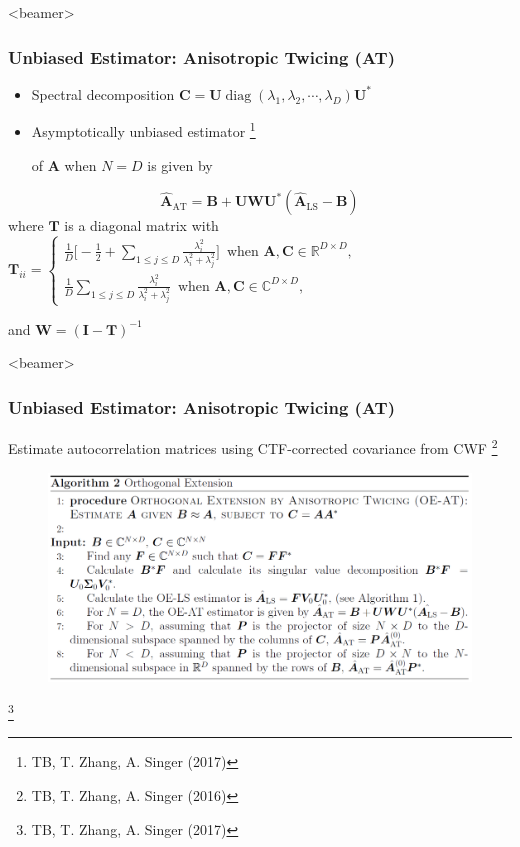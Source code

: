 \documentclass{beamer}
\newcommand\blfootnote[1]{%
  \begingroup
  \renewcommand\thefootnote{}\footnote{#1}%
  \addtocounter{footnote}{-1}%
  \endgroup
}
\newcommand{\bC}{\boldsymbol{C}}
\newcommand{\bT}{\boldsymbol{T}}
\newcommand{\bW}{\boldsymbol{W}}
\newcommand{\bU}{\boldsymbol{U}}
\newcommand{\bI}{\boldsymbol{I}}
\def\bA{\boldsymbol{A}}
\def\bB{\boldsymbol{B}}
\newcommand{\diag}{\operatorname{diag}}
\begin{document}
\begin{frame}<beamer>
\frametitle{Unbiased Estimator: Anisotropic Twicing (AT)}
\begin{itemize}
\item Spectral decomposition $\bC=\bU\diag(\lambda_1,\lambda_2,\cdots,\lambda_D)\bU^*$
\item Asymptotically unbiased estimator \blfootnote{TB, T. Zhang, A. Singer (2017)} of $\bA$ when $N=D$ is given by
\end{itemize}

\begin{equation*}
\hat{\bA}_{\text{AT}}=\bB+\bU\bW\bU^*(\hat{\bA}_{\text{LS}}-\bB) \nonumber
\end{equation*}
where 
$\bT$ is a diagonal matrix with
$\bT_{ii}=\begin{cases}\frac{1}{D}\Big[-\frac{1}{2}+\sum_{1\leq j\leq 
D}\frac{\lambda_i^2}{\lambda_i^2+\lambda_j^2}\Big]\,\,\,\text{when 
$\bA,\bC\in\mathbb{R}^{D\times D}$},\\\frac{1}{D}\sum_{1\leq j\leq 
D}\frac{\lambda_i^2}{\lambda_i^2+\lambda_j^2}
\,\,\,\text{when $\bA,\bC\in\mathbb{C}^{D\times D}$},
\end{cases}$

and $\bW=(\bI-\bT)^{-1}$
\end{frame}

\begin{frame}<beamer>
\frametitle{Unbiased Estimator: Anisotropic Twicing (AT) }
Estimate autocorrelation matrices using CTF-corrected covariance from CWF \blfootnote{TB, T. Zhang, A. Singer (2016)}
\begin{figure}[!htbp]
\begin{center}
\includegraphics[scale=0.3]{figures/oeat_algo.png}
\end{center}
\end{figure}\blfootnote{TB, T. Zhang, A. Singer (2017)}
\end{frame}
\end{document}
